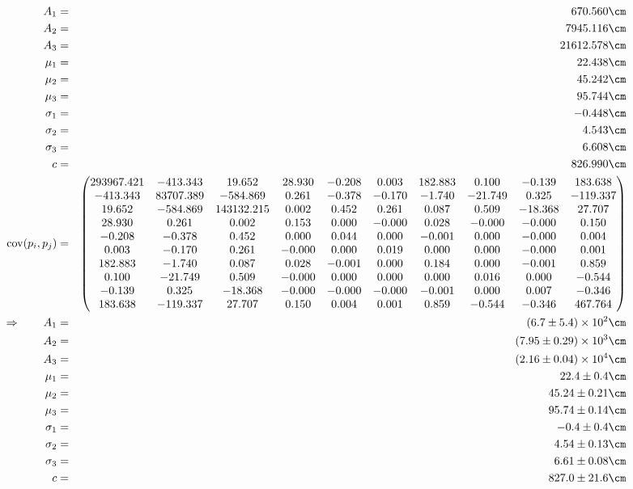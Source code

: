 \begin{eqnarray}
    A_1 &=& 670.560 \cm \nonumber \\
    A_2 &=& 7945.116 \cm \nonumber \\
    A_3 &=& 21612.578 \cm \nonumber \\
    \mu_1 &=& 22.438 \cm \nonumber \\
    \mu_2 &=& 45.242 \cm \nonumber \\
    \mu_3 &=& 95.744 \cm \nonumber \\
    \sigma_1 &=& -0.448 \cm \nonumber \\
    \sigma_2 &=& 4.543 \cm \nonumber \\
    \sigma_3 &=& 6.608 \cm \nonumber \\
    c &=& 826.990 \cm \nonumber \\
    \mathrm{cov}(p_i, p_j) &=& 
    \begin{pmatrix}
        293967.421 &-413.343 &19.652 &28.930 &-0.208 &0.003 &182.883 &0.100 &-0.139 &183.638 \\
        -413.343 &83707.389 &-584.869 &0.261 &-0.378 &-0.170 &-1.740 &-21.749 &0.325 &-119.337 \\
        19.652 &-584.869 &143132.215 &0.002 &0.452 &0.261 &0.087 &0.509 &-18.368 &27.707 \\
        28.930 &0.261 &0.002 &0.153 &0.000 &-0.000 &0.028 &-0.000 &-0.000 &0.150 \\
        -0.208 &-0.378 &0.452 &0.000 &0.044 &0.000 &-0.001 &0.000 &-0.000 &0.004 \\
        0.003 &-0.170 &0.261 &-0.000 &0.000 &0.019 &0.000 &0.000 &-0.000 &0.001 \\
        182.883 &-1.740 &0.087 &0.028 &-0.001 &0.000 &0.184 &0.000 &-0.001 &0.859 \\
        0.100 &-21.749 &0.509 &-0.000 &0.000 &0.000 &0.000 &0.016 &0.000 &-0.544 \\
        -0.139 &0.325 &-18.368 &-0.000 &-0.000 &-0.000 &-0.001 &0.000 &0.007 &-0.346 \\
        183.638 &-119.337 &27.707 &0.150 &0.004 &0.001 &0.859 &-0.544 &-0.346 &467.764 \\
    \end{pmatrix}
\\ \Rightarrow \qquad
    A_1 &=& \left(6.7 \pm 5.4\right) \times 10^{2} \cm\\
    A_2 &=& \left(7.95 \pm 0.29\right) \times 10^{3} \cm\\
    A_3 &=& \left(2.16 \pm 0.04\right) \times 10^{4} \cm\\
    \mu_1 &=& 22.4 \pm 0.4 \cm\\
    \mu_2 &=& 45.24 \pm 0.21 \cm\\
    \mu_3 &=& 95.74 \pm 0.14 \cm\\
    \sigma_1 &=& -0.4 \pm 0.4 \cm\\
    \sigma_2 &=& 4.54 \pm 0.13 \cm\\
    \sigma_3 &=& 6.61 \pm 0.08 \cm\\
    c &=& 827.0 \pm 21.6 \cm
\end{eqnarray}

